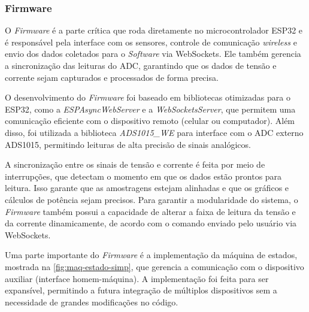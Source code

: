 \subsubsection{Firmware}\label{firmw}

O \textit{Firmware} é a parte crítica que roda diretamente no microcontrolador ESP32 e é responsável pela interface com os sensores, controle de comunicação \textit{wireless} e envio dos dados coletados para o \textit{Software} via WebSockets. Ele também gerencia a sincronização das leituras do ADC, garantindo que os dados de tensão e corrente sejam capturados e processados de forma precisa.

O desenvolvimento do \textit{Firmware} foi baseado em bibliotecas otimizadas para o ESP32, como a \textit{ESPAsyncWebServer} e a \textit{WebSocketsServer}, que permitem uma comunicação eficiente com o dispositivo remoto (celular ou computador). Além disso, foi utilizada a biblioteca \textit{ADS1015\_WE} para interface com o ADC externo ADS1015, permitindo leituras de alta precisão de sinais analógicos.

A sincronização entre os sinais de tensão e corrente é feita por meio de interrupções, que detectam o momento em que os dados estão prontos para leitura. Isso garante que as amostragens estejam alinhadas e que os gráficos e cálculos de potência sejam precisos. Para garantir a modularidade do sistema, o \textit{Firmware} também possui a capacidade de alterar a faixa de leitura da tensão e da corrente dinamicamente, de acordo com o comando enviado pelo usuário via WebSockets.

Uma parte importante do \textit{Firmware} é a implementação da máquina de estados, mostrada na \autoref{fig:maq-estado-simp}, que gerencia a comunicação com o dispositivo auxiliar (interface homem-máquina). A implementação foi feita para ser expansível, permitindo a futura integração de múltiplos dispositivos sem a necessidade de grandes modificações no código.

